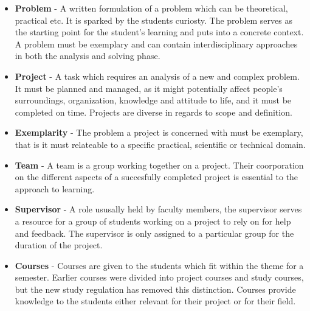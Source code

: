 \begin{itemize}
	\item \textbf{Problem} - A written formulation of a problem which can be theoretical, practical etc. It is sparked by the students curiosty. The problem serves as the starting point for the student's learning and puts into a concrete context. A problem must be exemplary and can contain interdisciplinary approaches	in both the analysis and solving phase.
	\item \textbf{Project} - A task which requires an analysis of a new and complex problem. It must be planned and managed, as it might potentially affect people's surroundings, organization, knowledge and attitude to life, and it must be completed on time. Projects are diverse in regards to scope and definition.
	\item \textbf{Exemplarity} - The problem a project is concerned with must be exemplary, that is it must relateable to a specific practical, scientific or technical domain.
	\item \textbf{Team} - A team is a group working together on a project. Their coorporation on the different aspects of a succesfully completed project is essential to the approach to learning.
	\item \textbf{Supervisor} - A role ususally held by faculty members, the supervisor serves a resource for a group of students working on a project to rely on for help and feedback. The supervisor is only assigned to a particular group for the duration of the project. 
	\item \textbf{Courses} - Courses are given to the students which fit within the theme for a semester. Earlier courses were divided into project courses and study courses, but the new study regulation has removed this distinction. Courses provide knowledge to the students either relevant for their project or for their field.
\end{itemize}

